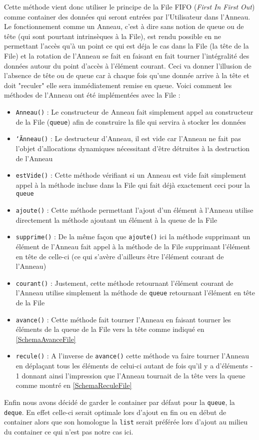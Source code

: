 \documentclass{article}
\newcommand{\info}{\texttt}
\begin{document}
        Cette méthode vient donc utiliser le principe de la File FIFO (\emph{First In First Out}) comme container des données qui seront entrées par l'Utilisateur dans l'Anneau. Le fonctionnement comme un Anneau, c'est à dire sans notion de queue ou de tête (qui sont pourtant intrinsèques à la File), est rendu possible en ne permettant l'accès qu'à un point ce qui est déja le cas dans la File (la tête de la File) et la rotation de l'Anneau se fait en faisant en fait tourner l'intégralité des données autour du point d'accès à l'élément courant. Ceci va donner l'illusion de l'absence de tête ou de queue car à chaque fois qu'une donnée arrive à la tête et doit "reculer" elle sera immédiatement remise en queue.
        Voici comment les méthodes de l'Anneau ont été implémentées avec la File :
        \begin{itemize}
            \item \info{Anneau()} : Le constructeur de Anneau fait simplement appel au constructeur de la File (\info{queue}) afin de construire la file qui servira à stocker les données
            \item \info{\info{\char`\~Anneau()}} : Le destructeur d'Anneau, il est vide car l'Anneau ne fait pas l'objet d'allocations dynamiques nécessitant d'être détruites à la destruction de l'Anneau
            \item \info{estVide()} : Cette méthode vérifiant si un Anneau est vide fait simplement appel à la méthode incluse dans la File qui fait déjà exactement ceci pour la \info{queue}
            \item \info{ajoute()} : Cette méthode permettant l'ajout d'un élément à l'Anneau utilise directement la méthode ajoutant un élément à la queue de la File
            \item \info{supprime()} : De la même façon que \info{ajoute()} ici la méthode supprimant un élément de l'Anneau fait appel à la méthode de la File supprimant l'élément en tête de celle-ci (ce qui s'avère d'ailleurs être l'élément courant de l'Anneau)
            \item \info{courant()} : Justement, cette méthode retournant l'élément courant de l'Anneau utilise simplement la méthode de \info{queue} retournant l'élément en tête de la File
            \item \info{avance()} : Cette méthode fait tourner l'Anneau en faisant tourner les éléments de la queue de la File vers la tête comme indiqué en \ref{SchemaAvanceFile}
            \item \info{recule()} : A l'inverse de \info{avance()} cette méthode va faire tourner l'Anneau en déplaçant tous les éléments de celui-ci autant de fois qu'il y a d'éléments - 1 donnant ainsi l'impression que l'Anneau tournait de la tête vers la queue comme montré en \ref{SchemaReculeFile}
        \end{itemize}
        Enfin nous avons décidé de garder le container par défaut pour la \info{queue}, la \info{deque}. En effet celle-ci serait optimale lors d'ajout en fin ou en début de container alors que son homologue la \info{list} serait préférée lors d'ajout au milieu du container ce qui n'est pas notre cas ici.
        
\end{document}
